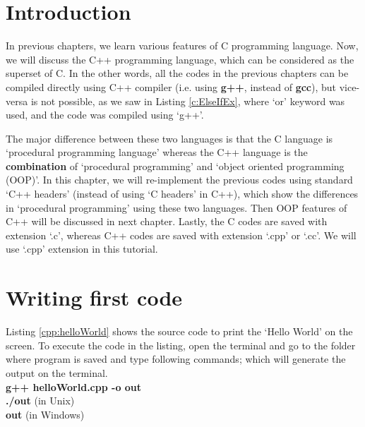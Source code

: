 \section{Introduction}

In previous chapters, we learn various features of C programming language. Now, we will discuss the C++ programming language, which can be considered as the superset of C. In the other words, all the codes in the previous chapters can be compiled directly using C++ compiler (i.e. using \textbf{g++}, instead of \textbf{gcc}), but vice-versa is not possible, as we saw in Listing \ref{c:ElseIfEx}, where `or' keyword was used, and the code was compiled using `g++'. 

The major difference between these two languages is that the C language is `procedural programming language' whereas the C++ language is the \textbf{combination} of `procedural programming' and `object oriented programming (OOP)'. In this chapter, we will re-implement the previous codes using standard `C++ headers' (instead of using `C headers' in C++), which show the differences in `procedural programming' using these two languages. Then OOP features of C++ will be discussed in next chapter.  Lastly, the C codes are saved with extension `.c', whereas C++ codes are saved with extension `.cpp' or `.cc'. We will use `.cpp' extension in this tutorial. 

\section{Writing first code}
Listing \ref{cpp:helloWorld} shows the source code to print the `Hello World' on the screen. To execute the code in the listing, open the terminal and go to the folder where program is saved and type following commands; which will generate the output on the terminal. 
\\
\textbf{\textdollar { \ } g++ helloWorld.cpp -o out} \\
\textbf{\textdollar { \ }  ./out} (in Unix)\\
\textbf{\textdollar { \ }  out} (in Windows)


